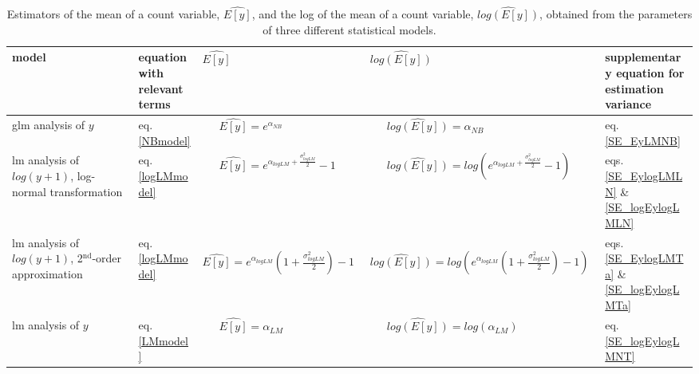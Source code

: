 \documentclass[]{article}
\begin{document}
\clearpage

\begin{landscape}

\begin{table}
\begin{center}
\caption{Estimators of the mean of a count variable, $\widehat{E[y]}$, and the log of the mean of a count variable, $\widehat{log(E[y])}$, obtained from the parameters of three different statistical models.}
\label{EstimatorsTable}
\vspace{2mm}
\begin{tabular}{p{2.8cm} p{2.2cm} l l p{2.8cm}}
\hline
\hline
model  & equation with relevant terms    & $\widehat{E[y]}$  & $\widehat{log(E[y])}$ & supplementary equation for estimation variance \\
\hline

  glm analysis of $y$  
& eq. \ref{NBmodel} 
& {equation}\label{EyNB}\thetag{\theequation}~~~$\widehat{E[y]}=e^{\alpha_{NB}}$ 
& {equation}\label{logEyNB}\thetag{\theequation}~~~$\widehat{log(E[y])}=\alpha_{NB}$ 
& eq. \ref{SE_EyLMNB} \\

  lm analysis of $log(y+1)$, log-normal transformation 
& eq. \ref{logLMmodel} 
& {equation}\label{EylogLMLN}\thetag{\theequation}~~~$\widehat{E[y]}=e^{\alpha_{logLM}+\frac{\sigma^2_{logLM}}{2}}-1$ 
& {equation}\label{logEylogLMLN}\thetag{\theequation}~~~$\widehat{log(E[y])}=log(e^{\alpha_{logLM}+\frac{\sigma^2_{logLM}}{2}}-1)$ 
& eqs. \ref{SE_EylogLMLN} \& \ref{SE_logEylogLMLN}  \\

  lm analysis of $log(y+1)$, 2$^{\text{nd}}$-order approximation 
& eq. \ref{logLMmodel} 
& {equation}\label{EylogLMTa}\thetag{\theequation}~~~$\widehat{E[y]}=e^{\alpha_{logLM}}(1+\frac{\sigma^2_{logLM}}{2})-1$ 
& {equation}\label{logEylogLMTa}\thetag{\theequation}~~~$\widehat{log(E[y])}=log(e^{\alpha_{logLM}}(1+\frac{\sigma^2_{logLM}}{2})-1)$ 
& eqs. \ref{SE_EylogLMTa} \& \ref{SE_logEylogLMTa} \\

  lm analysis of $y$  
& eq. \ref{LMmodel} 
& {equation}\label{EyLM}\thetag{\theequation}~~~$\widehat{E[y]}=\alpha_{LM}$ 
& {equation}\label{logEyLM}\thetag{\theequation}~~~$\widehat{log(E[y])}=log(\alpha_{LM})$ 
& eq. \ref{SE_logEylogLMNT} \\

\hline
\hline
\end{tabular}
\end{center}
\end{table}

\end{landscape}
\end{document}
